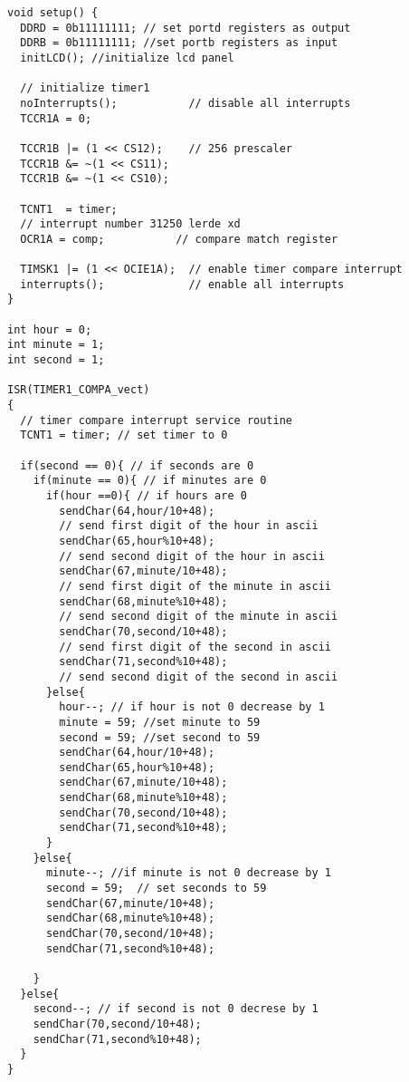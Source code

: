 \documentclass[pdftex,12pt,a4paper]{article}
\begin{document}
\begin{flushleft}
\begin{lstlisting}[language=Arduino]
void setup() {
  DDRD = 0b11111111; // set portd registers as output
  DDRB = 0b11111111; //set portb registers as input
  initLCD(); //initialize lcd panel
 
  // initialize timer1 
  noInterrupts();           // disable all interrupts
  TCCR1A = 0;
  
  TCCR1B |= (1 << CS12);    // 256 prescaler
  TCCR1B &= ~(1 << CS11);
  TCCR1B &= ~(1 << CS10);
    
  TCNT1  = timer;
  // interrupt number 31250 lerde xd
  OCR1A = comp;           // compare match register
  
  TIMSK1 |= (1 << OCIE1A);  // enable timer compare interrupt
  interrupts();             // enable all interrupts
}

int hour = 0;
int minute = 1;
int second = 1;

ISR(TIMER1_COMPA_vect) 
{
  // timer compare interrupt service routine
  TCNT1 = timer; // set timer to 0

  if(second == 0){ // if seconds are 0
    if(minute == 0){ // if minutes are 0
      if(hour ==0){ // if hours are 0
        sendChar(64,hour/10+48); 
        // send first digit of the hour in ascii
        sendChar(65,hour%10+48);
        // send second digit of the hour in ascii
        sendChar(67,minute/10+48);
        // send first digit of the minute in ascii
        sendChar(68,minute%10+48);
        // send second digit of the minute in ascii
        sendChar(70,second/10+48);
        // send first digit of the second in ascii
        sendChar(71,second%10+48);
        // send second digit of the second in ascii
      }else{
        hour--; // if hour is not 0 decrease by 1
        minute = 59; //set minute to 59
        second = 59; //set second to 59
        sendChar(64,hour/10+48);
        sendChar(65,hour%10+48);
        sendChar(67,minute/10+48);
        sendChar(68,minute%10+48);
        sendChar(70,second/10+48);
        sendChar(71,second%10+48);
      }
    }else{
      minute--; //if minute is not 0 decrease by 1
      second = 59;	// set seconds to 59
      sendChar(67,minute/10+48);
      sendChar(68,minute%10+48);
      sendChar(70,second/10+48);
      sendChar(71,second%10+48);
      
    }
  }else{
    second--; // if second is not 0 decrese by 1
    sendChar(70,second/10+48);
    sendChar(71,second%10+48);
  }
}



\end{lstlisting}
\end{flushleft}
\end{document}
